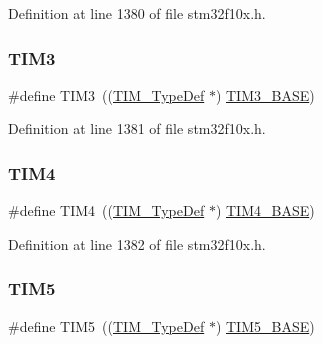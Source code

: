 Definition at line 1380 of file stm32f10x.\+h.

\mbox{\label{group___peripheral__declaration_ga61ee4c391385607d7af432b63905fcc9}} 
\subsubsection{\texorpdfstring{T\+I\+M3}{TIM3}}
{\footnotesize\ttfamily \#define T\+I\+M3~((\hyperlink{struct_t_i_m___type_def}{T\+I\+M\+\_\+\+Type\+Def} $\ast$) \hyperlink{group___peripheral__memory__map_gaf0c34a518f87e1e505cd2332e989564a}{T\+I\+M3\+\_\+\+B\+A\+SE})}



Definition at line 1381 of file stm32f10x.\+h.

\mbox{\label{group___peripheral__declaration_ga91a09bad8bdc7a1cb3d85cf49c94c8ec}} 
\subsubsection{\texorpdfstring{T\+I\+M4}{TIM4}}
{\footnotesize\ttfamily \#define T\+I\+M4~((\hyperlink{struct_t_i_m___type_def}{T\+I\+M\+\_\+\+Type\+Def} $\ast$) \hyperlink{group___peripheral__memory__map_ga56e2d44b0002f316527b8913866a370d}{T\+I\+M4\+\_\+\+B\+A\+SE})}



Definition at line 1382 of file stm32f10x.\+h.

\mbox{\label{group___peripheral__declaration_ga5125ff6a23a2ed66e2e19bd196128c14}} 
\subsubsection{\texorpdfstring{T\+I\+M5}{TIM5}}
{\footnotesize\ttfamily \#define T\+I\+M5~((\hyperlink{struct_t_i_m___type_def}{T\+I\+M\+\_\+\+Type\+Def} $\ast$) \hyperlink{group___peripheral__memory__map_ga3e1671477190d065ba7c944558336d7e}{T\+I\+M5\+\_\+\+B\+A\+SE})}



